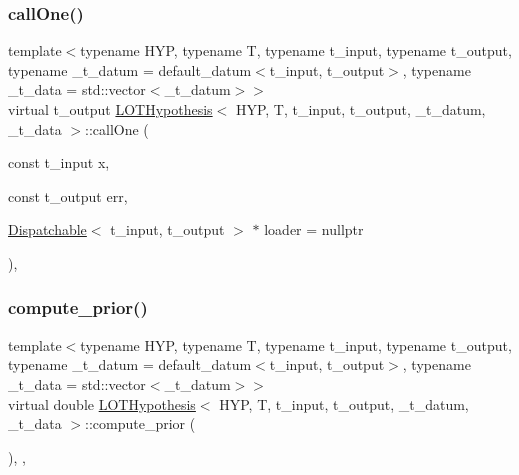 \mbox{\label{class_l_o_t_hypothesis_ad792b258bdb4b0828f11ac721f52e704}} 
\subsubsection{\texorpdfstring{call\+One()}{callOne()}}
{\footnotesize\ttfamily template$<$typename H\+YP, typename T, typename t\+\_\+input, typename t\+\_\+output, typename \+\_\+t\+\_\+datum = default\+\_\+datum$<$t\+\_\+input, t\+\_\+output$>$, typename \+\_\+t\+\_\+data = std\+::vector$<$\+\_\+t\+\_\+datum$>$$>$ \\
virtual t\+\_\+output \hyperlink{class_l_o_t_hypothesis}{L\+O\+T\+Hypothesis}$<$ H\+YP, T, t\+\_\+input, t\+\_\+output, \+\_\+t\+\_\+datum, \+\_\+t\+\_\+data $>$\+::call\+One (\begin{DoxyParamCaption}\item[{const t\+\_\+input}]{x,  }\item[{const t\+\_\+output}]{err,  }\item[{\hyperlink{class_dispatchable}{Dispatchable}$<$ t\+\_\+input, t\+\_\+output $>$ $\ast$}]{loader = {\ttfamily nullptr} }\end{DoxyParamCaption})\hspace{0.3cm}{\ttfamily [inline]}, {\ttfamily [virtual]}}

\mbox{\label{class_l_o_t_hypothesis_a80eea871bc115e4ef585f75f06857b39}} 
\subsubsection{\texorpdfstring{compute\+\_\+prior()}{compute\_prior()}}
{\footnotesize\ttfamily template$<$typename H\+YP, typename T, typename t\+\_\+input, typename t\+\_\+output, typename \+\_\+t\+\_\+datum = default\+\_\+datum$<$t\+\_\+input, t\+\_\+output$>$, typename \+\_\+t\+\_\+data = std\+::vector$<$\+\_\+t\+\_\+datum$>$$>$ \\
virtual double \hyperlink{class_l_o_t_hypothesis}{L\+O\+T\+Hypothesis}$<$ H\+YP, T, t\+\_\+input, t\+\_\+output, \+\_\+t\+\_\+datum, \+\_\+t\+\_\+data $>$\+::compute\+\_\+prior (\begin{DoxyParamCaption}{ }\end{DoxyParamCaption})\hspace{0.3cm}{\ttfamily [inline]}, {\ttfamily [override]}, {\ttfamily [virtual]}}



